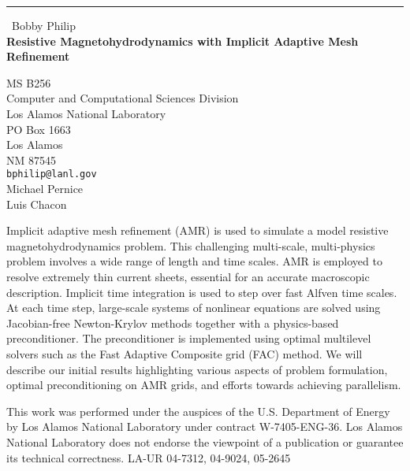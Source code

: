 \documentclass{report}
\begin{document}
\begin{center}
\rule{6in}{1pt} \
{\large Bobby Philip \\
{\bf Resistive Magnetohydrodynamics with Implicit Adaptive Mesh Refinement}}

MS B256 \\ Computer and Computational Sciences Division \\ Los Alamos National Laboratory \\ PO Box 1663 \\ Los Alamos \\ NM 87545
\\
{\tt bphilip@lanl.gov}\\
Michael Pernice\\
Luis Chacon\end{center}

Implicit adaptive mesh refinement (AMR) is used to simulate a model
resistive magnetohydrodynamics problem. This challenging multi-scale,
multi-physics problem involves a wide range of length and time scales.
AMR is employed to resolve extremely thin current sheets, essential for
an accurate macroscopic description. Implicit time integration is used to
step over fast Alfven time scales. At each time step, large-scale systems
of nonlinear equations are solved using Jacobian-free Newton-Krylov
methods together with a physics-based preconditioner. The preconditioner
is implemented using optimal multilevel solvers such as the Fast Adaptive
Composite grid (FAC) method. We will describe our initial results
highlighting various aspects of problem formulation, optimal
preconditioning on AMR grids, and efforts towards achieving parallelism.

This work was performed under the auspices of the U.S. Department of
Energy by Los Alamos National Laboratory under contract W-7405-ENG-36.
Los Alamos National Laboratory does not endorse the viewpoint of a
publication or guarantee its technical correctness. LA-UR 04-7312,
04-9024, 05-2645
\end{document}
